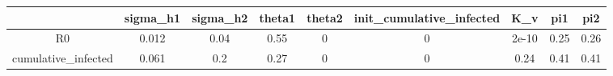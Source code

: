\begin{tabular}{|c|c|c|c|c|c|c|c|c|}
\hline
& sigma_h1 & sigma_h2 & theta1 & theta2 & init_cumulative_infected & K_v & pi1 & pi2 \\
\hline
R0 & 0.012 & 0.04 & 0.55 & 0 & 0 & 2e-10 & 0.25 & 0.26 \\
\hline
cumulative_infected & 0.061 & 0.2 & 0.27 & 0 & 0 & 0.24 & 0.41 & 0.41 \\
\hline
\end{tabular}
